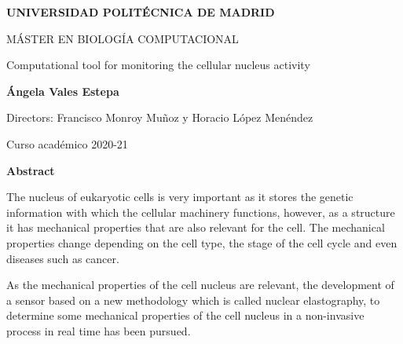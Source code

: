 \documentclass[12pt, a4paper]{article} %
\begin{document}
\setlength{\parindent}{8pt}

\pagestyle{empty}


\begin{titlepage}

{} %
\vspace{1cm}

\centering
{ \bfseries \Large UNIVERSIDAD POLITÉCNICA DE MADRID}
\vspace{2cm}

{ \Large MÁSTER EN BIOLOGÍA COMPUTACIONAL}
\vspace{2cm}

{\Large Computational tool for monitoring the cellular nucleus activity}\vspace{2cm}

{\bfseries \LARGE Ángela Vales Estepa}\vspace{2cm}

{\Large Directors: Francisco Monroy Muñoz y Horacio López Menéndez}\vspace{20mm} 

{\large Curso acad\'emico 2020-21}\vspace{5mm} 

\end{titlepage}
\newpage


{\bfseries \Large Abstract }\vspace{5mm} 

The nucleus of eukaryotic cells is very important as it stores the genetic information with which the cellular machinery functions, however, as a structure it has mechanical properties that are also relevant for the cell. The mechanical properties change depending on the cell type, the stage of the cell cycle and even diseases such as cancer. 

As the mechanical properties of the cell nucleus are relevant, the development of a sensor based on a new methodology which is called nuclear elastography, to determine some mechanical properties of the cell nucleus in a non-invasive process in real time has been pursued.
\end{document}
